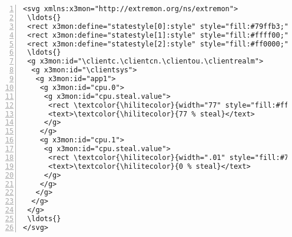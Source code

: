 \documentclass[10pt]{article}
\begin{document}
\begin{Verbatim}[numbers=left,numbersep=6pt,fontsize=\small,commandchars=\\\{\}]
<svg xmlns:x3mon="http://extremon.org/ns/extremon">
 \ldots{} 
 <rect x3mon:define="statestyle[0]:style" style="fill:#79ffb3;"/>
 <rect x3mon:define="statestyle[1]:style" style="fill:#ffff00;"/>
 <rect x3mon:define="statestyle[2]:style" style="fill:#ff0000;"/>
 \ldots{}
 <g x3mon:id="\clientc.\clientcn.\clientou.\clientrealm">
  <g x3mon:id="\clientsys">
   <g x3mon:id="app1">
    <g x3mon:id="cpu.0">
     <g x3mon:id="cpu.steal.value">
      <rect \textcolor{\hilitecolor}{width="77" style="fill:#ff0000;"} \ldots{}>
      <text>\textcolor{\hilitecolor}{77 % steal}</text> 
     </g>
    </g>
    <g x3mon:id="cpu.1">
     <g x3mon:id="cpu.steal.value">
      <rect \textcolor{\hilitecolor}{width=".01" style="fill:#79ffb3;"} \ldots{}>
      <text>\textcolor{\hilitecolor}{0 % steal}</text>
     </g>
    </g>
   </g>
  </g>
 </g>
 \ldots{}
</svg>
\end{Verbatim}
\end{document}
